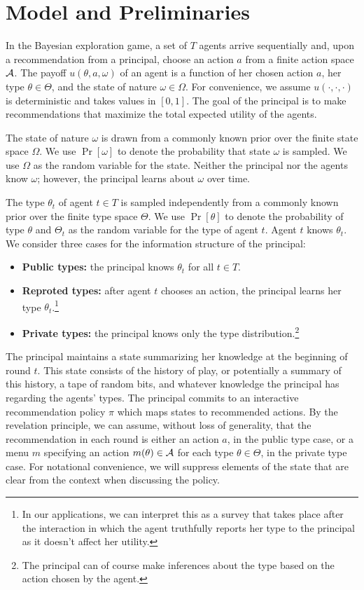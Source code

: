 \section{Model and Preliminaries}

In the Bayesian exploration game, a set of $T$ agents arrive sequentially and, upon a recommendation from a principal, choose an action $a$ from a finite action space $\mathcal{A}$.  The payoff $u(\theta,a,\omega)$ of an agent is a function of her chosen action $a$, her type $\theta\in\varTheta$, and the state of nature $\omega\in\varOmega$.  For convenience, we assume $u(\cdot,\cdot,\cdot)$ is deterministic and takes values in $[0,1]$.  The goal of the principal is to make recommendations that maximize the total expected utility of the agents.

The state of nature $\omega$ is drawn from a commonly known prior over the finite state space $\varOmega$. We use $\Pr[\omega]$ to denote the probability that state $\omega$ is sampled. We use $\Omega$ as the random variable for the state.  Neither the principal nor the agents know $\omega$; however, the principal learns about $\omega$ over time.

The type $\theta_t$ of agent $t\in T$ is sampled independently from a commonly known prior over the finite type space $\varTheta$. We use $\Pr[\theta]$ to denote the probability of type $\theta$ and $\Theta_t$ as the random variable for the type of agent $t$.  Agent $t$ knows $\theta_t$.  We consider three cases for the information structure of the principal:
\begin{itemize}
	\item \textbf{Public types:} the principal knows $\theta_t$ for all $t\in T$.
	\item \textbf{Reproted types:} after agent $t$ chooses an action, the principal learns her type $\theta_t$.\footnote{In our applications, we can interpret this as a survey that takes place after the interaction in which the agent truthfully reports her type to the principal as it doesn't affect her utility.}
	\item \textbf{Private types:} the principal knows only the type distribution.\footnote{The principal can of course make inferences about the type based on the action chosen by the agent.}
\end{itemize}

The principal maintains a state summarizing her knowledge at the beginning of round $t$.  This state consists of the history of play, or potentially a summary of this history, a tape of random bits, and whatever knowledge the principal has regarding the agents' types.  The principal commits to an interactive recommendation policy $\pi$ which maps states to recommended actions. By the revelation principle, we can assume, without loss of generality, that the recommendation in each round is either an action $a$, in the public type case, or a menu $m$ specifying an action $m(\theta)\in\mathcal{A}$ for each type $\theta\in\varTheta$, in the private type case. For notational convenience, we will suppress elements of the state that are clear from the context when discussing the policy.

